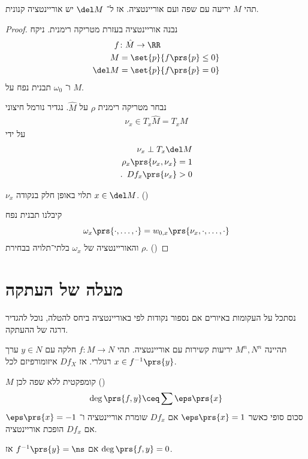 \documentclass[a4paper,10pt,twoside,openany]{book}
\begin{document}
\begin{theorem}
תהי
$M$
יריעה עם שפה ועם אוריינטציה.
אז ל־%
$\del M$
יש אוריינטציה קנונית.
\end{theorem}
\begin{proof}
נבנה אוריינטציה בעזרת מטריקה רימנית. ניקח
\begin{align*}
f &\colon \hat{M} \to \RR \\
M &= \set{p}{f\prs{p} \leq 0} \\
\del M &= \set{p}{f\prs{p} = 0}
\end{align*}
ו־%
$\omega_0$
תבנית נפח על
$M$.

נבחר מטריקה רימנית
$\rho$
על
$\hat{M}$.
נגדיר נורמל חיצוני
\begin{align*}
\nu_x \in T_x\hat{M} = T_x M
\end{align*}
על ידי
\begin{align*}
\nu_x \perp T_x \del M \\
\rho_x\prs{\nu_x, \nu_x} = 1 \\
\text{.} \phantom{\rho} D f_x\prs{\nu_x} > 0
\end{align*}

$\nu_x$
תלוי באופן חלק בנקודה
$x \in \del M$. ()

קיבלנו תבנית נפח
\[\omega_x \prs{\cdot, \ldots, \cdot} = w_{0,x}\prs{\nu_x, \cdot, \ldots, \cdot}\]
והאוריינטציה של
$\omega_x$
בלתי־תלויה בבחירת
$\rho$. ()
\end{proof}

\section{מעלה של העתקה}

נסתכל על העקומות באיורים
אם נספור נקודות לפי באוריינטציה ביחס להטלה, נוכל להגדיר דרגה של ההעתקה.

\begin{definition}
תהיינה
$M^n, N^n$
יריעות קשירות עם אוריינטציה.
תהי
$f \colon M \to N$
חלקה עם
$y \in N$
ערך רגולרי.
אז
$D f_X$
איזומורפיזם לכל
$x \in f^{-1}\prs{y}$.

$M$
קומפקטית ללא שפה לכן ()
\[\deg \prs{f,y} \ceq \sum \eps \prs{x}\]
סכום סופי כאשר
$\eps \prs{x} = 1$
אם
$D f_x$
שומרת אוריינטציה ו־%
$\eps \prs{x} = -1$
אם
$D f_x$
הופכת אוריינטציה.
\end{definition}

\begin{remark}
אם
$f^{-1}\prs{y} = \ns$
אז
$\deg\prs{f,y} = 0$.
\end{remark}
\end{document}
